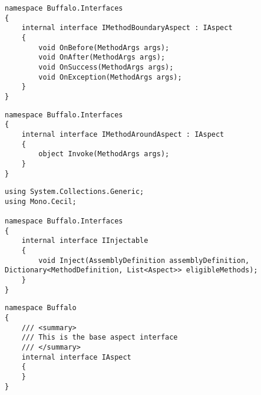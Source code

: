 \begin{lstlisting}[caption={../buffalo/Interfaces/IMethodBoundaryAspect.cs}, label=../buffalo/Interfaces/IMethodBoundaryAspect.cs, frame=tb, basicstyle=\scriptsize]﻿namespace Buffalo.Interfaces
{
    internal interface IMethodBoundaryAspect : IAspect
    {
        void OnBefore(MethodArgs args);
        void OnAfter(MethodArgs args);
        void OnSuccess(MethodArgs args);
        void OnException(MethodArgs args);
    }
}
\end{lstlisting}

\begin{lstlisting}[caption={../buffalo/Interfaces/IMethodAroundAspect.cs}, label=../buffalo/Interfaces/IMethodAroundAspect.cs, frame=tb, basicstyle=\scriptsize]﻿namespace Buffalo.Interfaces
{
    internal interface IMethodAroundAspect : IAspect
    {
        object Invoke(MethodArgs args);
    }
}
\end{lstlisting}

\begin{lstlisting}[caption={../buffalo/Interfaces/IInjectable.cs}, label=../buffalo/Interfaces/IInjectable.cs, frame=tb, basicstyle=\scriptsize]﻿using System.Collections.Generic;
using Mono.Cecil;

namespace Buffalo.Interfaces
{
    internal interface IInjectable
    {
        void Inject(AssemblyDefinition assemblyDefinition, Dictionary<MethodDefinition, List<Aspect>> eligibleMethods);
    }
}
\end{lstlisting}

\begin{lstlisting}[caption={../buffalo/Interfaces/IAspect.cs}, label=../buffalo/Interfaces/IAspect.cs, frame=tb, basicstyle=\scriptsize]﻿namespace Buffalo
{
    /// <summary>
    /// This is the base aspect interface
    /// </summary>
    internal interface IAspect
    {
    }
}
\end{lstlisting}

